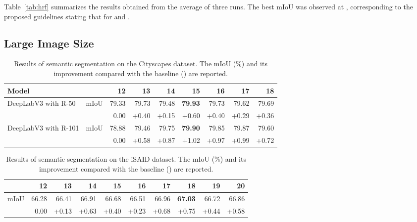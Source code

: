\documentclass{article}
\def\tabref#1{Table~\ref{#1}}
\begin{document}
\tabref{tab:hrf} summarizes the results obtained from the average of three runs. The best mIoU was observed at , corresponding to the proposed guidelines stating that  for  and .



\subsection{Large Image Size}
\label{sec:largesize}

\begin{table}[t!]
	\caption{Results of semantic segmentation on the Cityscapes dataset. The mIoU (\%) and its improvement  compared with the baseline () are reported.}
	\label{tab:city}
	\centering
	\begin{tabular}{l|c|rrrrrrr}
		\toprule
		Model                                 &       & 12    & 13    & 14    & 15         & 16    & 17    & 18    \\
		\midrule
		\multirow{2}{*}{DeepLabV3 with R-50}  & mIoU     & 79.33 & 79.73 & 79.48 & \textbf{79.93} & 79.73 & 79.62 & 79.69 \\
		                                      &  & 0.00  & +0.40 & +0.15 & +0.60          & +0.40 & +0.29 & +0.36 \\
		\midrule
		\multirow{2}{*}{DeepLabV3 with R-101} & mIoU     & 78.88 & 79.46 & 79.75 & \textbf{79.90} & 79.85 & 79.87 & 79.60 \\
		                                      &  & 0.00  & +0.58 & +0.87 & +1.02          & +0.97 & +0.99 & +0.72 \\
		\bottomrule
	\end{tabular}
\end{table}

\begin{table}
	\caption{Results of semantic segmentation on the iSAID dataset. The mIoU (\%) and its improvement  compared with the baseline () are reported.}
	\label{tab:isaid}
	\centering
	\begin{tabular}{c|rrrrrrrrr}
		\toprule
		      & 12    & 13    & 14    & 15    & 16    & 17    & 18         & 19    & 20    \\
		\midrule
		mIoU     & 66.28 & 66.41 & 66.91 & 66.68 & 66.51 & 66.96 & \textbf{67.03} & 66.72 & 66.86 \\
		 & 0.00  & +0.13 & +0.63 & +0.40 & +0.23 & +0.68 & +0.75          & +0.44 & +0.58 \\
		\bottomrule
	\end{tabular}
\end{table}
\end{document}
